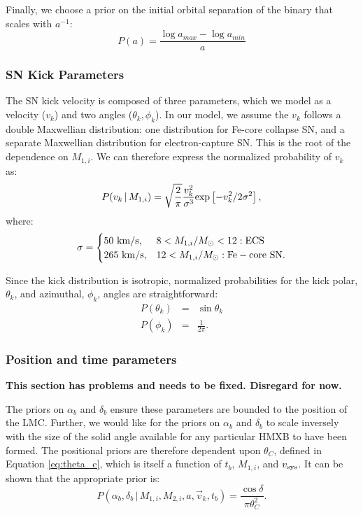 \documentclass[12pt, preprint]{aastex}
\newcommand{\given}{\,|\,}
\newcommand{\Msun}{\ifmmode {M_{\odot}}\else${M_{\odot}}$\fi}
\begin{document}
Finally, we choose a prior on the initial orbital separation of the binary that scales with $a^{-1}$:
\begin{equation}
P(a) = \frac{\log a_{max} - \log a_{min}}{a}
\end{equation}


\subsubsection{SN Kick Parameters}

The SN kick velocity is composed of three parameters, which we model as a velocity ($v_k$) and two angles ($\theta_k, \phi_k$). In our model, we assume the $v_k$ follows a double Maxwellian distribution: one distribution for Fe-core collapse SN, and a separate Maxwellian distribution for electron-capture SN. This is the root of the dependence on $M_{1,i}$. We can therefore express the normalized probability of $v_k$ as:
\begin{equation}
P(v_k \given M_{1,i}) = \sqrt{\frac{2}{\pi}} \frac{v_k^2} {\sigma^3} {\rm exp} \left[ -v_k^2 / 2 \sigma^2 \right], \label{eq:P_v_k}
\end{equation}
where:
\begin{equation}
\sigma = 
\begin{cases} 
      50\ {\rm km/s}, & 8 < M_{1,i}/\Msun < 12: {\rm ECS}\\
     265\ {\rm km/s}, & 12 < M_{1,i}/\Msun: {\rm Fe-core\ SN}.
   \end{cases}
\end{equation}

Since the kick distribution is isotropic, normalized probabilities for the kick polar, $\theta_k$, and azimuthal, $\phi_k$, angles are straightforward:
\begin{eqnarray}
P(\theta_k) &=& \sin \theta_k \label{eq:P_theta_k} \\
P(\phi_k) &=& \frac{1}{2 \pi}. \label{eq:P_phi_k}
\end{eqnarray}


\subsubsection{Position and time parameters}

{\bf This section has problems and needs to be fixed. Disregard for now.}

The priors on $\alpha_b$ and $\delta_b$ ensure these parameters are bounded to the position of the LMC. Further, we would like for the priors on $\alpha_b$ and $\delta_b$ to scale inversely with the size of the solid angle available for any particular HMXB to have been formed. The positional priors are therefore dependent upon $\theta_C$, defined in Equation \ref{eq:theta_c}, which is itself a function of $t_b$, $M_{1,i}$, and $v_{\rm sys}$. It can be shown that the appropriate prior is:
\begin{equation}
P(\alpha_b, \delta_b \given M_{1,i}, M_{2,i}, a, \vec{v}_k, t_b) = \frac{\cos \delta}{\pi \theta_C^2}.
\end{equation}
\end{document}
